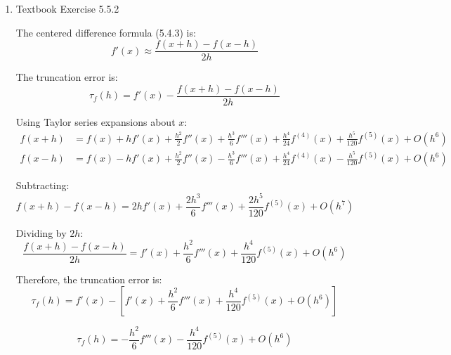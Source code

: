 \documentclass[reqno]{exam}
\begin{document}
\begin{enumerate}
\begin{solution}
Therefore, the centered formula converges to equality as $h \to 0$.

\textbf{(b)} Consider the general finite-difference formula:
$$f'(x) \approx \frac{1}{h}\sum_{k=-p}^{q} a_k f(x+kh)$$

For convergence as $h \to 0$, we need:
$$\lim_{h \to 0} \frac{\sum_{k=-p}^{q} a_k f(x+kh)}{h} = f'(x)$$

\textbf{Condition 1:} For the indeterminate form $\frac{0}{0}$ to occur (so L'Hôpital's Rule can be applied), the numerator must approach 0:
$$\lim_{h \to 0} \sum_{k=-p}^{q} a_k f(x+kh) = \sum_{k=-p}^{q} a_k f(x) = 0$$

This requires:
$$\boxed{\sum_{k=-p}^{q} a_k = 0}$$

\textbf{Condition 2:} Applying L'Hôpital's Rule:
$$\lim_{h \to 0} \frac{\sum_{k=-p}^{q} a_k f(x+kh)}{h} = \lim_{h \to 0} \frac{\sum_{k=-p}^{q} a_k \cdot k \cdot f'(x+kh)}{1} = f'(x) \sum_{k=-p}^{q} k a_k$$

For this to equal $f'(x)$:
$$\boxed{\sum_{k=-p}^{q} k a_k = 1}$$
\end{solution}

\item Textbook Exercise 5.5.2

\begin{solution}
The centered difference formula (5.4.3) is:
$$f'(x) \approx \frac{f(x+h) - f(x-h)}{2h}$$

The truncation error is:
$$\tau_f(h) = f'(x) - \frac{f(x+h) - f(x-h)}{2h}$$

Using Taylor series expansions about $x$:
\begin{align*}
f(x+h) &= f(x) + hf'(x) + \frac{h^2}{2}f''(x) + \frac{h^3}{6}f'''(x) + \frac{h^4}{24}f^{(4)}(x) + \frac{h^5}{120}f^{(5)}(x) + O(h^6)\\
f(x-h) &= f(x) - hf'(x) + \frac{h^2}{2}f''(x) - \frac{h^3}{6}f'''(x) + \frac{h^4}{24}f^{(4)}(x) - \frac{h^5}{120}f^{(5)}(x) + O(h^6)
\end{align*}

Subtracting:
$$f(x+h) - f(x-h) = 2hf'(x) + \frac{2h^3}{6}f'''(x) + \frac{2h^5}{120}f^{(5)}(x) + O(h^7)$$

Dividing by $2h$:
$$\frac{f(x+h) - f(x-h)}{2h} = f'(x) + \frac{h^2}{6}f'''(x) + \frac{h^4}{120}f^{(5)}(x) + O(h^6)$$

Therefore, the truncation error is:
$$\tau_f(h) = f'(x) - \left[f'(x) + \frac{h^2}{6}f'''(x) + \frac{h^4}{120}f^{(5)}(x) + O(h^6)\right]$$

$$\boxed{\tau_f(h) = -\frac{h^2}{6}f'''(x) - \frac{h^4}{120}f^{(5)}(x) + O(h^6)}$$


\end{solution}
\end{enumerate}
\end{document}
